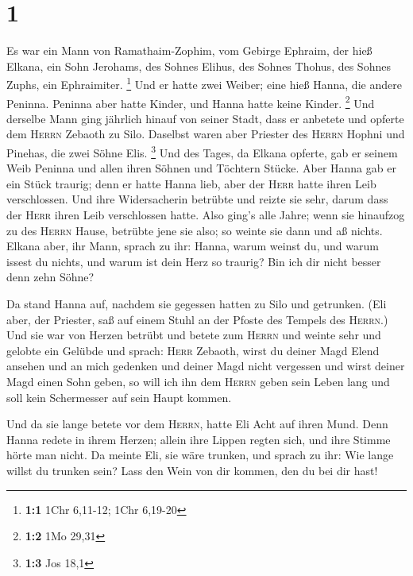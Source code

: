 \hypertarget{section}{%
\section{1}\label{section}}

 Es war ein Mann von Ramathaim-Zophim, vom Gebirge
Ephraim, der hieß Elkana, ein Sohn Jerohams, des Sohnes Elihus, des
Sohnes Thohus, des Sohnes Zuphs, ein Ephraimiter. \footnote{\textbf{1:1}
  1Chr 6,11-12; 1Chr 6,19-20}  Und er hatte zwei Weiber;
eine hieß Hanna, die andere Peninna. Peninna aber hatte Kinder, und
Hanna hatte keine Kinder. \footnote{\textbf{1:2} 1Mo 29,31}
 Und derselbe Mann ging jährlich hinauf von seiner Stadt,
dass er anbetete und opferte dem \textsc{Herrn} Zebaoth zu Silo.
Daselbst waren aber Priester des \textsc{Herrn} Hophni und Pinehas, die
zwei Söhne Elis. \footnote{\textbf{1:3} Jos 18,1}  Und des
Tages, da Elkana opferte, gab er seinem Weib Peninna und allen ihren
Söhnen und Töchtern Stücke.  Aber Hanna gab er ein Stück
traurig; denn er hatte Hanna lieb, aber der \textsc{Herr} hatte ihren
Leib verschlossen.  Und ihre Widersacherin betrübte und
reizte sie sehr, darum dass der \textsc{Herr} ihren Leib verschlossen
hatte.  Also ging's alle Jahre; wenn sie hinaufzog zu des
\textsc{Herrn} Hause, betrübte jene sie also; so weinte sie dann und aß
nichts.  Elkana aber, ihr Mann, sprach zu ihr: Hanna,
warum weinst du, und warum issest du nichts, und warum ist dein Herz so
traurig? Bin ich dir nicht besser denn zehn Söhne?

 Da stand Hanna auf, nachdem sie gegessen hatten zu Silo
und getrunken. (Eli aber, der Priester, saß auf einem Stuhl an der
Pfoste des Tempels des \textsc{Herrn}.)  Und sie war von
Herzen betrübt und betete zum \textsc{Herrn} und weinte sehr
 und gelobte ein Gelübde und sprach: \textsc{Herr}
Zebaoth, wirst du deiner Magd Elend ansehen und an mich gedenken und
deiner Magd nicht vergessen und wirst deiner Magd einen Sohn geben, so
will ich ihn dem \textsc{Herrn} geben sein Leben lang und soll kein
Schermesser auf sein Haupt kommen.

 Und da sie lange betete vor dem \textsc{Herrn}, hatte
Eli Acht auf ihren Mund.  Denn Hanna redete in ihrem
Herzen; allein ihre Lippen regten sich, und ihre Stimme hörte man nicht.
Da meinte Eli, sie wäre trunken,  und sprach zu ihr: Wie
lange willst du trunken sein? Lass den Wein von dir kommen, den du bei
dir hast!

